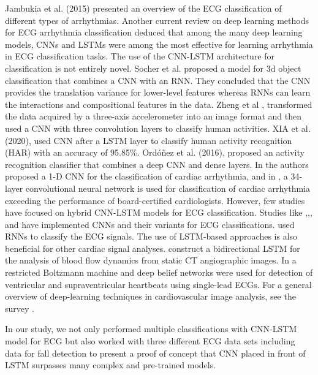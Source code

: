 \documentclass{ieeeaccess}
\begin{document}
Jambukia et al. (2015) \cite{7164783} presented an overview of the ECG classification of different types of arrhythmias. Another current review on deep learning methods for ECG arrhythmia classification \cite{EBRAHIMI2020100033} deduced that among the many deep learning models, CNNs and LSTMs were among the most effective for learning arrhythmia in ECG classification tasks.
The use of the CNN-LSTM architecture for classification is not entirely novel. Socher et al. \cite{NIPS2012_3eae62bb} proposed a model for 3d object classification that combines a CNN with an RNN. They concluded that the CNN provides the translation variance for lower-level features whereas RNNs can learn the interactions and compositional features in the data. Zheng et al \cite{zheng}, transformed the data acquired by a three-axis accelerometer into an image format and then used a CNN with three convolution layers to classify human activities. XIA et al. (2020), \cite{xia} used CNN after a LSTM layer to classify human activity recognition (HAR) with an accuracy of 95.85\%. Ordóñez et al. (2016),\cite{ordonez} proposed an activity recognition classifier that combines a deep CNN and dense layers. In \cite{YildirimEtAl} the authors proposed a 1-D CNN for the classification of cardiac arrhythmia, and in \cite{HannunEtAl}, a 34-layer convolutional neural network is used for classification of cardiac arrhythmia exceeding the performance of board-certified cardiologists.
However, few studies have focused on hybrid CNN-LSTM models for ECG classification. Studies like \cite{8419425},\cite{2019},\cite{WANG2021106006}, and \cite{e23010119} have implemented CNNs and their variants for ECG classifications. \cite{saadat} used RNNs to classify the ECG signals. The use of LSTM-based approaches is also beneficial for other cardiac signal analyses. \cite{GAO202082} construct a bidirectional LSTM for the analysis of blood flow dynamics from static CT angiographic images. In \cite{MathewsEtAl} a restricted Boltzmann machine and deep belief networks were used for detection of ventricular and supraventricular heartbeats using single-lead ECGs. For a general overview of deep-learning techniques in cardiovascular image analysis, see the survey \cite{LitjensEtAl}.

In our study, we not only performed multiple classifications with CNN-LSTM model for ECG but also worked with three different ECG data sets including data for fall detection to present a proof of concept that CNN placed in front of LSTM surpasses many complex and pre-trained models.
\end{document}
